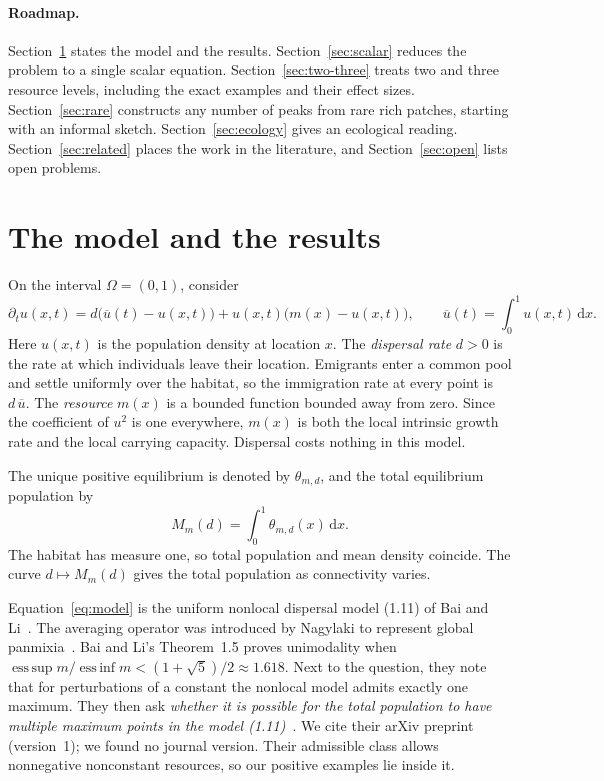 \documentclass[11pt]{article}
\theoremstyle{remark}
\newcommand{\dd}{\,\mathrm d}
\begin{document}
\paragraph{Roadmap.}
Section~\ref{sec:results} states the model and the results.
Section~\ref{sec:scalar} reduces the problem to a single scalar equation.
Section~\ref{sec:two-three} treats two and three resource levels,
including the exact examples and their effect sizes.
Section~\ref{sec:rare} constructs any number of peaks from rare rich
patches, starting with an informal sketch.
Section~\ref{sec:ecology} gives an ecological reading. Section~\ref{sec:related}
places the work in the literature, and Section~\ref{sec:open} lists open
problems.

\section{The model and the results}\label{sec:results}

On the interval \(\Omega=(0,1)\), consider
\begin{equation}\label{eq:model}
 \partial_t u(x,t)=d\bigl(\overline u(t)-u(x,t)\bigr)
                 +u(x,t)\bigl(m(x)-u(x,t)\bigr),
 \qquad
 \overline u(t)=\int_0^1u(x,t)\dd x .
\end{equation}
Here \(u(x,t)\) is the population density at location \(x\). The
\emph{dispersal rate} \(d>0\) is the rate at which individuals leave
their location. Emigrants enter a common pool and settle uniformly over
the habitat, so the immigration rate at every point is \(d\,\overline u\).
The \emph{resource} \(m(x)\) is a bounded function bounded away from zero.
Since the coefficient of \(u^2\) is one everywhere, \(m(x)\) is both the
local intrinsic growth rate and the local carrying capacity. Dispersal
costs nothing in this model.

The unique positive equilibrium is denoted by \(\theta_{m,d}\), and the
total equilibrium population by
\begin{equation}\label{eq:population}
 M_m(d)=\int_0^1\theta_{m,d}(x)\dd x .
\end{equation}
The habitat has measure one, so total population and mean density
coincide. The curve \(d\mapsto M_m(d)\) gives the total population as
connectivity varies.

Equation~\eqref{eq:model} is the uniform nonlocal dispersal model (1.11)
of Bai and Li~\cite{BaiLi2021}. The averaging operator was introduced by
Nagylaki to represent global panmixia~\cite{Nagylaki2011}. Bai and Li's
Theorem~1.5 proves unimodality when
\(\operatorname*{ess\,sup}m/\operatorname*{ess\,inf}m<(1+\sqrt5)/2\approx
1.618\). Next to the question, they note that for perturbations of a
constant the nonlocal model admits exactly one maximum. They then ask
\emph{whether it is possible for the total population to have multiple
maximum points in the model (1.11)}~\cite[Section~5, p.~20]{BaiLi2021}.
We cite their arXiv preprint (version~1); we found no journal version.
Their admissible class allows nonnegative nonconstant resources, so our
positive examples lie inside it.
\end{document}
